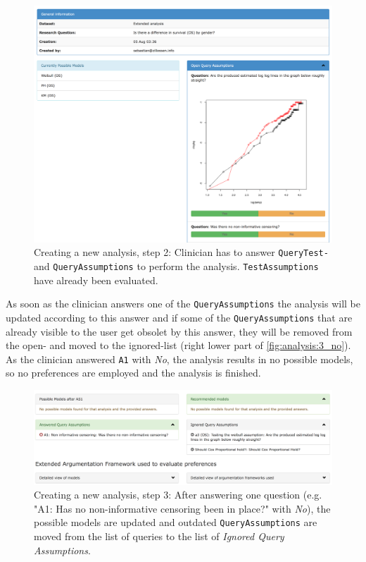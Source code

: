 \begin{figure}[h]
	\centering
	\includegraphics[width=\textwidth]{figures/ui_analysis_1}
	\caption{Creating a new analysis, step 2: Clinician has to answer \texttt{QueryTest-} and \texttt{QueryAssumptions} to perform the analysis. \texttt{TestAssumptions} have already been evaluated.}
	\label{fig:analysis:2}
\end{figure}


As soon as the clinician answers one of the \texttt{QueryAssumptions} the analysis will be updated according to this answer and if some of the \texttt{QueryAssumptions} that are already visible to the user get obsolet by this answer, they will be removed from the open- and moved to the ignored-list (right lower part of \autoref{fig:analysis:3_no}). 
As the clinician answered \texttt{A1} with \textit{No}, the analysis results in no possible models, so no preferences are employed and the analysis is finished.

\begin{figure}[t]
	\centering
	\includegraphics[width=\textwidth]{figures/ui_analysis_2_no}
	\caption{Creating a new analysis, step 3: After answering one question (e.g. "A1: Has no non-informative censoring been in place?" with \textit{No}), the possible models are updated and outdated \texttt{QueryAssumptions} are moved from the list of queries to the list of \textit{Ignored Query Assumptions}.}
	\label{fig:analysis:3_no}
\end{figure}

